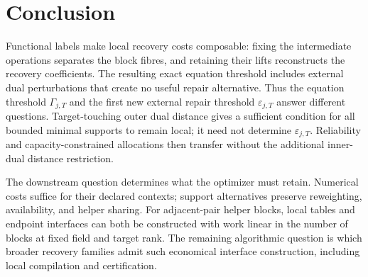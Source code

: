 \section{Conclusion}

Functional labels make local recovery costs composable: fixing the
intermediate operations separates the block fibres, and retaining their
lifts reconstructs the recovery coefficients.  The resulting exact equation
threshold includes external dual perturbations that create no useful repair
alternative.  Thus the equation threshold $\Gamma_{j,T}$ and the first
new external repair threshold $\varepsilon_{j,T}$ answer different questions.
Target-touching outer dual distance gives a sufficient condition for all bounded
minimal supports to remain local; it need not determine $\varepsilon_{j,T}$.
Reliability and capacity-constrained allocations then transfer without the
additional inner-dual distance restriction.

The downstream question determines what the optimizer must retain.
Numerical costs suffice for their declared contexts; support alternatives
preserve reweighting, availability, and helper sharing.
For adjacent-pair helper blocks, local tables and endpoint interfaces
can both be constructed with work linear in the number of blocks at fixed
field and target rank.  The remaining algorithmic question is which broader
recovery families admit such economical interface construction, including
local compilation and certification.
